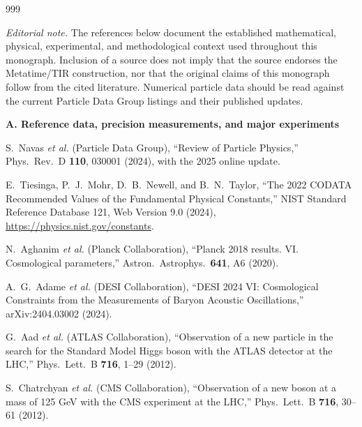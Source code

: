 

\renewcommand{\bibname}{Bibliography and Source Map}
\begin{thebibliography}{999}
\small
\sloppy

\item[]\textit{Editorial note.} The references below document the established
mathematical, physical, experimental, and methodological context used throughout
this monograph. Inclusion of a source does not imply that the source endorses the
Metatime/TIR construction, nor that the original claims of this monograph follow
from the cited literature. Numerical particle data should be read against the
current Particle Data Group listings and their published updates.

\item[]\textbf{A. Reference data, precision measurements, and major experiments}

S.~Navas \emph{et al.} (Particle Data Group),
``Review of Particle Physics,''
Phys.\ Rev.\ D \textbf{110}, 030001 (2024), with the 2025 online update.

E.~Tiesinga, P.~J.~Mohr, D.~B.~Newell, and B.~N.~Taylor,
``The 2022 CODATA Recommended Values of the Fundamental Physical Constants,''
NIST Standard Reference Database 121, Web Version 9.0 (2024),
\url{https://physics.nist.gov/constants}.

N.~Aghanim \emph{et al.} (Planck Collaboration),
``Planck 2018 results. VI. Cosmological parameters,''
Astron.\ Astrophys.\ \textbf{641}, A6 (2020).

A.~G.~Adame \emph{et al.} (DESI Collaboration),
``DESI 2024 VI: Cosmological Constraints from the Measurements of Baryon
Acoustic Oscillations,'' arXiv:2404.03002 (2024).

G.~Aad \emph{et al.} (ATLAS Collaboration),
``Observation of a new particle in the search for the Standard Model Higgs
boson with the ATLAS detector at the LHC,''
Phys.\ Lett.\ B \textbf{716}, 1--29 (2012).

S.~Chatrchyan \emph{et al.} (CMS Collaboration),
``Observation of a new boson at a mass of 125 GeV with the CMS experiment at
the LHC,'' Phys.\ Lett.\ B \textbf{716}, 30--61 (2012).


\end{thebibliography}
